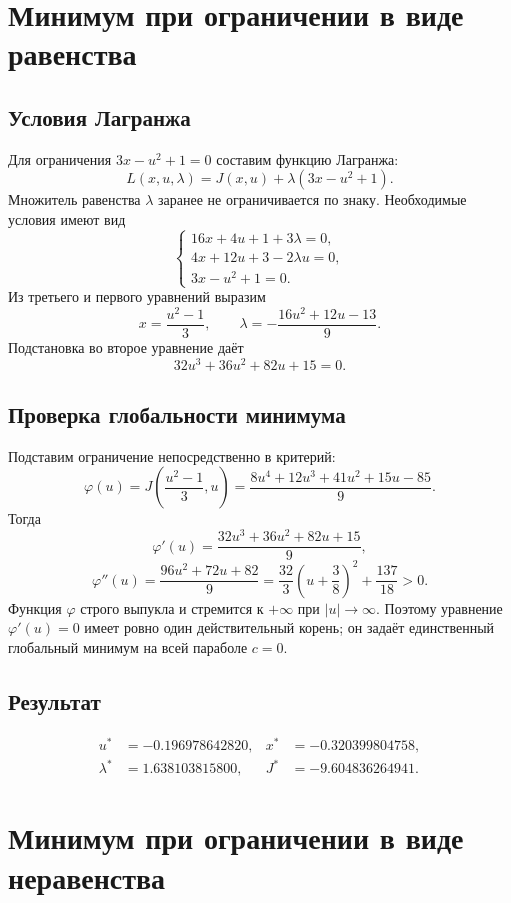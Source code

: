 \documentclass[12pt,a4paper]{article}
\begin{document}
\section{Минимум при ограничении в виде равенства}
\subsection{Условия Лагранжа}
Для ограничения $3x-u^2+1=0$ составим функцию Лагранжа:
\[
L(x,u,\lambda)=J(x,u)+\lambda(3x-u^2+1).
\]
Множитель равенства $\lambda$ заранее не ограничивается по знаку.
Необходимые условия имеют вид
\begin{equation}
\begin{cases}
16x+4u+1+3\lambda=0,\\
4x+12u+3-2\lambda u=0,\\
3x-u^2+1=0.
\end{cases}
\end{equation}
Из третьего и первого уравнений выразим
\[
x=\frac{u^2-1}{3},\qquad
\lambda=-\frac{16u^2+12u-13}{9}.
\]
Подстановка во второе уравнение даёт
\begin{equation}
32u^3+36u^2+82u+15=0.
\end{equation}

\subsection{Проверка глобальности минимума}
Подставим ограничение непосредственно в критерий:
\[
\varphi(u)=J\!\left(\frac{u^2-1}{3},u\right)
=\frac{8u^4+12u^3+41u^2+15u-85}{9}.
\]
Тогда
\[
\varphi'(u)=\frac{32u^3+36u^2+82u+15}{9},
\]
\[
\varphi''(u)=\frac{96u^2+72u+82}{9}
=\frac{32}{3}\left(u+\frac38\right)^2+\frac{137}{18}>0.
\]
Функция $\varphi$ строго выпукла и стремится к $+\infty$ при $|u|\to\infty$.
Поэтому уравнение $\varphi'(u)=0$ имеет ровно один действительный корень;
он задаёт единственный глобальный минимум на всей параболе $c=0$.

\subsection{Результат}
\begin{align*}
u^*&=-0.196978642820,& x^*&=-0.320399804758,\\
\lambda^*&=1.638103815800,& J^*&=-9.604836264941.
\end{align*}
\newpage

\section{Минимум при ограничении в виде неравенства}
\end{document}
